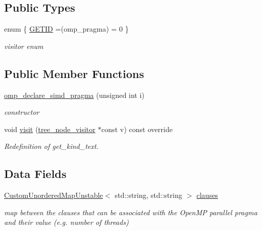 \subsection*{Public Types}
\begin{DoxyCompactItemize}
\item 
enum \{ \hyperlink{structomp__declare__simd__pragma_af24292cdcf103c8cfd1cc2a14b67bf30a4c514c8ab769f356b3124f0c82af6c84}{G\+E\+T\+ID} =(omp\+\_\+pragma) = 0
 \}\begin{DoxyCompactList}\small\item\em visitor enum \end{DoxyCompactList}
\end{DoxyCompactItemize}
\subsection*{Public Member Functions}
\begin{DoxyCompactItemize}
\item 
\hyperlink{structomp__declare__simd__pragma_a93e0e35946a1c0b5f6b807524adf8cd3}{omp\+\_\+declare\+\_\+simd\+\_\+pragma} (unsigned int i)
\begin{DoxyCompactList}\small\item\em constructor \end{DoxyCompactList}\item 
void \hyperlink{structomp__declare__simd__pragma_a3745037752b1b165a418e50058eed19a}{visit} (\hyperlink{classtree__node__visitor}{tree\+\_\+node\+\_\+visitor} $\ast$const v) const override
\begin{DoxyCompactList}\small\item\em Redefinition of get\+\_\+kind\+\_\+text. \end{DoxyCompactList}\end{DoxyCompactItemize}
\subsection*{Data Fields}
\begin{DoxyCompactItemize}
\item 
\hyperlink{custom__map_8hpp_a8cbaceffc09790a885ec7e9c17809c69}{Custom\+Unordered\+Map\+Unstable}$<$ std\+::string, std\+::string $>$ \hyperlink{structomp__declare__simd__pragma_a2f2bffc513678b2e6fc7a5f2f0da523e}{clauses}
\begin{DoxyCompactList}\small\item\em map between the clauses that can be associated with the Open\+MP parallel pragma and their value (e.\+g. number of threads) \end{DoxyCompactList}\end{DoxyCompactItemize}
